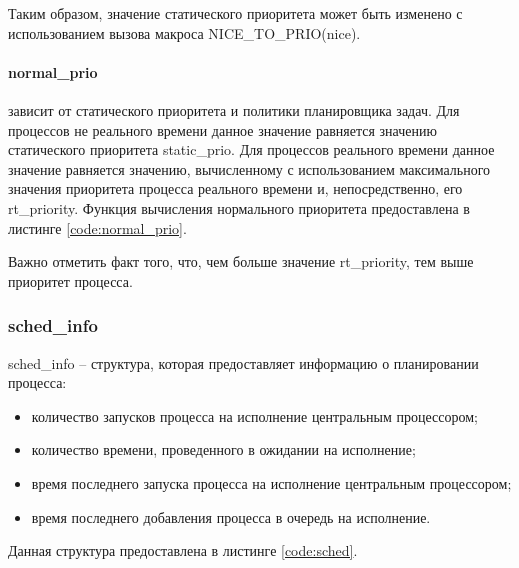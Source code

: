 Таким образом, значение статического приоритета может быть изменено с использованием вызова макроса NICE\_TO\_PRIO(nice).

\paragraph*{normal\_prio} зависит от статического приоритета и политики планировщика задач. Для процессов не реального времени данное значение равняется значению статического приоритета static\_prio. Для процессов реального времени данное значение равняется значению, вычисленному с использованием максимального значения приоритета процесса реального времени и, непосредственно, его rt\_priority. Функция вычисления нормального приоритета предоставлена в листинге \ref{code:normal_prio}.


Важно отметить факт того, что, чем больше значение rt\_priority, тем выше приоритет процесса.

\subsubsection{sched\_info} 
sched\_info -- структура, которая предоставляет информацию о планировании процесса:
\begin{itemize}[leftmargin=1.6\parindent]
\item количество запусков процесса на исполнение центральным процессором;
\item количество времени, проведенного в ожидании на исполнение;
\item время последнего запуска процесса на исполнение центральным процессором;
\item время последнего добавления процесса в очередь на исполнение.
\end{itemize}

Данная структура предоставлена в листинге \ref{code:sched}.


